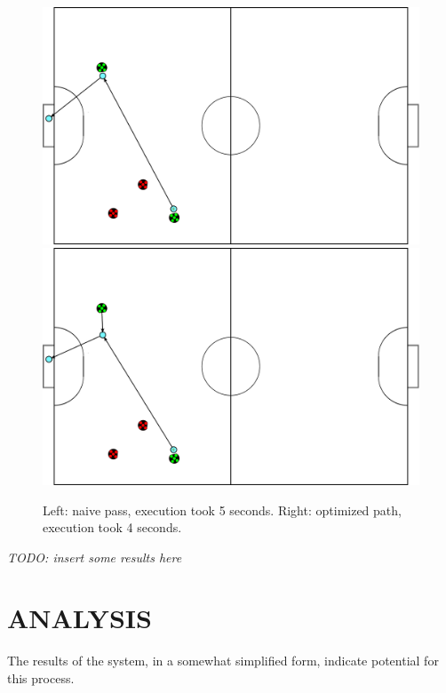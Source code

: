 \documentclass[a4paper, 10pt, conference]{ieeeconf}      %
\begin{document}
\begin{figure}[ht!]
\begin{center}
\includegraphics[totalheight=1.0in]{nonoptimized_plan}
\includegraphics[totalheight=1.0in]{optimized_plan}
\end{center}
\caption{Left: naive pass, execution took 5 seconds. Right: optimized path, execution took 4 seconds.}
\end{figure}

\textit{TODO: insert some results here}

\section{ANALYSIS}
The results of the system, in a somewhat simplified form, indicate potential for this process.
\end{document}
